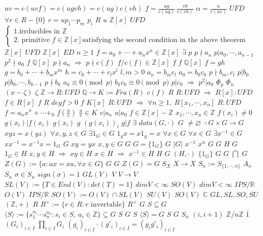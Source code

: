 \documentclass{article}
\begin{document}
$uv=c(uvf)=c(ugvh)=c(ug)c(vh)$
$f=\frac{ug}{c(ug)}\ \frac{vh}{c(vh)}$
$\alpha=\frac{u}{c(uv)}$
$UFD$
$\forall r \in R-\{0\}$
$r=up_1\cdots p_m$
$p_i$
$R$
$u$
$\mathbb{Z}[x]$
$UFD$
$\begin{cases}1. \text{irrducibles in } \mathbb{Z}\\2. \text{ primitive } f \in \mathbb{Z}[x] \text{satisfying the second condition in the above theorem}\end{cases}$
$\mathbb{Z}[x]$
$UFD$
$\mathbb{Z}[x]$
$ED$
$n \geq 1$
$f=a_0 + \cdots+a_nx^n \in \mathbb{Z}[x]$
$\exists$
$p$
$p \nmid a_n$
$p|a_0,\cdots,a_{n-1}$
$p^2 \nmid a_0$
$f$
$\mathbb{Q}[x]$
$p \nmid a_n$
$\Rightarrow$
$p \nmid c(f)$
$f/c(f) \in \mathbb{Z}[x]$
$f$
$f$
$\mathbb{Q}[x]$
$f=gh$
$g=b_0+\cdots+b_mx^m$
$h=c_0+\cdots+c_lx^l$
$l,m>0$
$a_n=b_mc_l$
$a_0=b_0c_0$
$p \nmid b_m,c_l$
$p|b_0$
$p|b_0,\cdots,b_{k-1}$
$p \nmid b_k$
$a_k \equiv 0 \pmod{p}$
$b_kc_0 \equiv 0 \pmod{p}$
$p|c_0$
$\Rightarrow$
$p^2|a_0$
$\Phi_p$
$\Phi_n$
$(x-\zeta)$
$\zeta$
$\mathbb{Z} \rightarrow R:UFD$
$\mathbb{Q} \rightarrow K:=Fra(R)$
$c(f)$
$R$
$R:UFD$
$\Rightarrow$
$R[x]:UFD$
$f \in R[x]$
$f$
$R$
$degf>0$
$f$
$K[x]$
$R:UFD$
$\Rightarrow$
$\forall n \geq 1,\ R[x_1,\cdots,x_n]$
$R:UFD$
$f=a_nx^n+\cdots+_0$
$f(\frac{u}{v})$
$\frac{u}{v} \in K$
$v|a_n$
$u|a_0$
$f \in \mathbb{Z}[x]-\mathbb{Z}$
$x_1,\cdots,x_n \in \mathbb{Z}$
$f(x_i) \neq 0$
$g(x_i)|f(x_i)$
$g(x_i)$
$g$
$(g(x_i))_i$
$g|f$
$\exists$
$data(G,\cdot)$
$G$
$\neq \varnothing$
$\cdot:G \times G \rightarrow G$
$xyz=x(yz)$
$\forall x,y,z \in G$
$\exists 1_G \in G$
$1_gx=x1_g=x$
$\forall x \in G$
$\forall x \in G$
$\exists x^{-1} \in G$
$xx^{-1}=x^{-1}x=1_G$
$G$
$xy=yx$
$x,y \in G$
$G$
$G=\{1_G\}$
$G$
$|G|$
$x^{-1}$
$x^n$
$G$
$G$
$H$
$G$
$1_G \in H$
$x,y \in H$
$\Rightarrow$
$xy \in H$
$x \in H$
$\Rightarrow$
$x^{-1} \in H$
$H$
$G$
$(H,\cdot)$
$\{1_G\}$
$G$
$G$
$\bigcap$
$G$
$Z(G):=\{a:ax=xa,\forall x \in G\}$
$G$
$G$
$Z(G)=G$
$S_X$
$X \rightarrow X$
$S_n:=S_{\{1,\cdots,n\}}$
$A_n$
$S_n$
$\sigma \in S_n$
$sign(\sigma)=1$
$GL(V)$
$V$
$V \rightarrow V$
$SL(V):=\{T \in End(V):det(T)=1\}$
$dimV<\infty$
$SO(V)$
$dimV<\infty$
$IPS/\mathbb{R}$
$O(V)$
$IPS/\mathbb{R}$
$SO(V):=O(V) \cap SL(V)$
$SU(V)$
$SO(V)$
$\mathbb{C}$
$GL,SL,SO,SU$
$(\mathbb{Z},+)$
$R$
$R^{\times}:=\{r \in R:r \text{ invertable}\}$
$R^\times$
$G$
$S \subseteq G$
$\langle S \rangle:=\{s_1^{a_1}\cdots s_n^{a_n}:s_i \in S,\ a_i \in \mathbb{Z}\} \subseteq G$
$S$
$G$
$S$
$\langle S \rangle=G$
$S$
$G$
$S_n$
$(i,i+1)$
$\mathbb{Z}/n\mathbb{Z}$
$\bar{1}$
$(G_i)_{i \in I}$
$\prod_{i \in I}G_i$
$(g_i)_{i \in I} \cdot (g'_i)_{i \in I}=(g_ig'_i)_{i \in I}$
\end{document}
